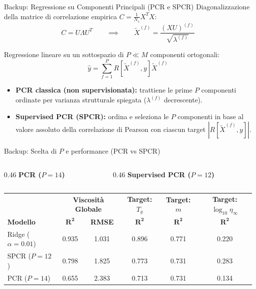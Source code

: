 \documentclass[10pt, aspectratio=169, table]{beamer}
\begin{document}
	\begin{frame}{Backup: Regressione su Componenti Principali (PCR e SPCR)}
		\small
		Diagonalizzazione della matrice di correlazione empirica $C = \frac{1}{N_s}X^T X$:
		$$C = U \Lambda U^T \qquad \implies \qquad \tilde{X}^{(f)} = \frac{(X U)^{(f)}}{\sqrt{\lambda^{(f)}}}$$
		
		Regressione lineare su un sottospazio di $P \ll M$ componenti ortogonali:
		$$\hat{y} = \sum_{f=1}^{P} R[\tilde{X}^{(f)}, y] \tilde{X}^{(f)}$$
		
		\vspace{0.2cm}
		\begin{itemize}
			\item \textbf{PCR classica (non supervisionata):} trattiene le prime $P$ componenti ordinate per varianza strutturale spiegata ($\lambda^{(f)}$ decrescente).
			\vspace{0.2cm}
			\item \textbf{Supervised PCR (SPCR):} ordina e seleziona le $P$ componenti in base al valore assoluto della correlazione di Pearson con ciascun target $|R[\tilde{X}^{(f)}, y]|$.
		\end{itemize}
	\end{frame}
	
	\begin{frame}{Backup: Scelta di $P$ e performance (PCR vs SPCR)}
		\begin{columns}[c]
			\begin{column}{0.46\textwidth}
				\centering
				{\footnotesize\bfseries PCR ($P = 14$)} \\[0.1cm]
			\end{column}
			\begin{column}{0.46\textwidth}
				\centering
				{\footnotesize\bfseries Supervised PCR ($P = 12$)} \\[0.1cm]
			\end{column}
		\end{columns}
		
		\vspace{0.25cm}
		\scriptsize
		\centering
		\renewcommand{\arraystretch}{1.15}
		\begin{tabular}{l|cc|c|c|c}
			\toprule
			& \multicolumn{2}{c|}{\textbf{Viscosità Globale}} & \textbf{Target: $T_g$} & \textbf{Target: $m$} & \textbf{Target: $\log_{10}\eta_\infty$} \\
			\textbf{Modello} & $\bm{R^2}$ & \textbf{RMSE} & $\bm{R^2}$ & $\bm{R^2}$ & $\bm{R^2}$ \\
			\midrule
			Ridge ($\alpha = 0.01$) & 0.935 & 1.031 & 0.896 & 0.771 & 0.220 \\
			SPCR ($P = 12$) & 0.798 & 1.825 & 0.773 & 0.731 & 0.283 \\
			PCR ($P = 14$) & 0.655 & 2.383 & 0.713 & 0.731 & 0.134 \\
			\bottomrule
		\end{tabular}
	\end{frame}
	
\end{document}
